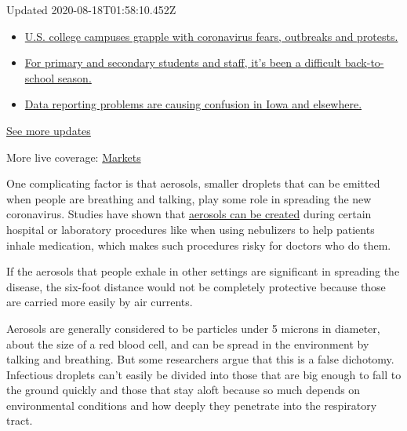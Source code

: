 Updated 2020-08-18T01:58:10.452Z

\begin{itemize}
\tightlist
\item
  \href{https://www.nytimes3xbfgragh.onion/2020/08/17/world/coronavirus-covid.html?action=click\&pgtype=Article\&state=default\&region=MAIN_CONTENT_1\&context=storylines_live_updates\#link-6fdbc8ef}{U.S.
  college campuses grapple with coronavirus fears, outbreaks and
  protests.}
\item
  \href{https://www.nytimes3xbfgragh.onion/2020/08/17/world/coronavirus-covid.html?action=click\&pgtype=Article\&state=default\&region=MAIN_CONTENT_1\&context=storylines_live_updates\#link-12d68713}{For
  primary and secondary students and staff, it's been a difficult
  back-to-school season.}
\item
  \href{https://www.nytimes3xbfgragh.onion/2020/08/17/world/coronavirus-covid.html?action=click\&pgtype=Article\&state=default\&region=MAIN_CONTENT_1\&context=storylines_live_updates\#link-6aa8318c}{Data
  reporting problems are causing confusion in Iowa and elsewhere.}
\end{itemize}

\href{https://www.nytimes3xbfgragh.onion/2020/08/17/world/coronavirus-covid.html?action=click\&pgtype=Article\&state=default\&region=MAIN_CONTENT_1\&context=storylines_live_updates}{See
more updates}

More live coverage:
\href{https://www.nytimes3xbfgragh.onion/live/2020/08/17/business/stock-market-today-coronavirus?action=click\&pgtype=Article\&state=default\&region=MAIN_CONTENT_1\&context=storylines_live_updates}{Markets}

One complicating factor is that aerosols, smaller droplets that can be
emitted when people are breathing and talking, play some role in
spreading the new coronavirus. Studies have shown that
\href{https://www.nejm.org/doi/10.1056/NEJMc2004973}{aerosols can be
created} during certain hospital or laboratory procedures like when
using nebulizers to help patients inhale medication, which makes such
procedures risky for doctors who do them.

If the aerosols that people exhale in other settings are significant in
spreading the disease, the six-foot distance would not be completely
protective because those are carried more easily by air currents.

Aerosols are generally considered to be particles under 5 microns in
diameter, about the size of a red blood cell, and can be spread in the
environment by talking and breathing. But some researchers argue that
this is a false dichotomy. Infectious droplets can't easily be divided
into those that are big enough to fall to the ground quickly and those
that stay aloft because so much depends on environmental conditions and
how deeply they penetrate into the respiratory tract.

